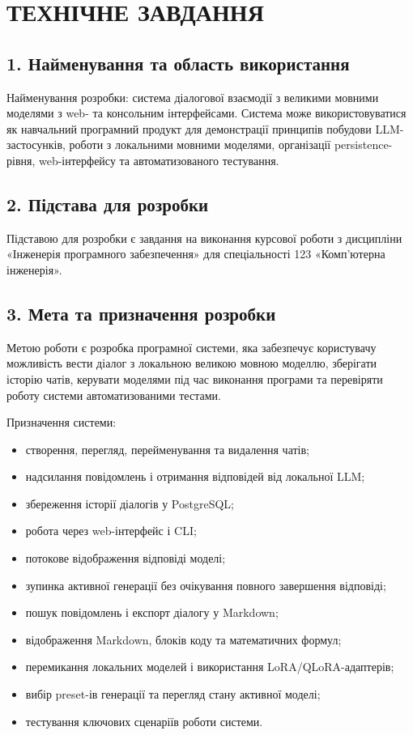 \newpage
\section*{ТЕХНІЧНЕ ЗАВДАННЯ}

\subsection*{1. Найменування та область використання}

Найменування розробки: система діалогової взаємодії з великими мовними моделями з web- та консольним інтерфейсами. Система може використовуватися як навчальний програмний продукт для демонстрації принципів побудови LLM-застосунків, роботи з локальними мовними моделями, організації persistence-рівня, web-інтерфейсу та автоматизованого тестування.

\subsection*{2. Підстава для розробки}

Підставою для розробки є завдання на виконання курсової роботи з дисципліни «Інженерія програмного забезпечення» для спеціальності 123 «Комп'ютерна інженерія».

\subsection*{3. Мета та призначення розробки}

Метою роботи є розробка програмної системи, яка забезпечує користувачу можливість вести діалог з локальною великою мовною моделлю, зберігати історію чатів, керувати моделями під час виконання програми та перевіряти роботу системи автоматизованими тестами.

Призначення системи:
\begin{itemize}
  \item створення, перегляд, перейменування та видалення чатів;
  \item надсилання повідомлень і отримання відповідей від локальної LLM;
  \item збереження історії діалогів у PostgreSQL;
  \item робота через web-інтерфейс і CLI;
  \item потокове відображення відповіді моделі;
  \item зупинка активної генерації без очікування повного завершення відповіді;
  \item пошук повідомлень і експорт діалогу у Markdown;
  \item відображення Markdown, блоків коду та математичних формул;
  \item перемикання локальних моделей і використання LoRA/QLoRA-адаптерів;
  \item вибір preset-ів генерації та перегляд стану активної моделі;
  \item тестування ключових сценаріїв роботи системи.
\end{itemize}

